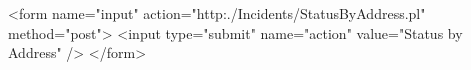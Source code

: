 \begin{rawhtml}
<form name="input" 
action="http:./Incidents/StatusByAddress.pl" method="post"> 
 <input type="submit" name="action" value="Status by Address" />
</form>
\end{rawhtml}
